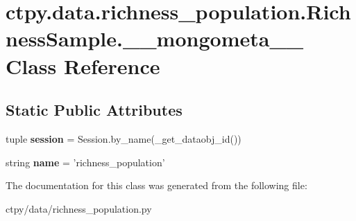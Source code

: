\hypertarget{classctpy_1_1data_1_1richness__population_1_1_richness_sample_1_1____mongometa____}{\section{ctpy.\-data.\-richness\-\_\-population.\-Richness\-Sample.\-\_\-\-\_\-mongometa\-\_\-\-\_\- Class Reference}
\label{classctpy_1_1data_1_1richness__population_1_1_richness_sample_1_1____mongometa____}
}
\subsection*{Static Public Attributes}
\begin{DoxyCompactItemize}
\item 
\hypertarget{classctpy_1_1data_1_1richness__population_1_1_richness_sample_1_1____mongometa_____a61f674d04bfb14bc760008bb56d62377}{tuple {\bfseries session} = Session.\-by\-\_\-name(\-\_\-get\-\_\-dataobj\-\_\-id())}\label{classctpy_1_1data_1_1richness__population_1_1_richness_sample_1_1____mongometa_____a61f674d04bfb14bc760008bb56d62377}

\item 
\hypertarget{classctpy_1_1data_1_1richness__population_1_1_richness_sample_1_1____mongometa_____abe2ac6bc1377b8c4dc82ea3207b7d2d7}{string {\bfseries name} = 'richness\-\_\-population'}\label{classctpy_1_1data_1_1richness__population_1_1_richness_sample_1_1____mongometa_____abe2ac6bc1377b8c4dc82ea3207b7d2d7}

\end{DoxyCompactItemize}


The documentation for this class was generated from the following file\-:\begin{DoxyCompactItemize}
\item 
ctpy/data/richness\-\_\-population.\-py\end{DoxyCompactItemize}
